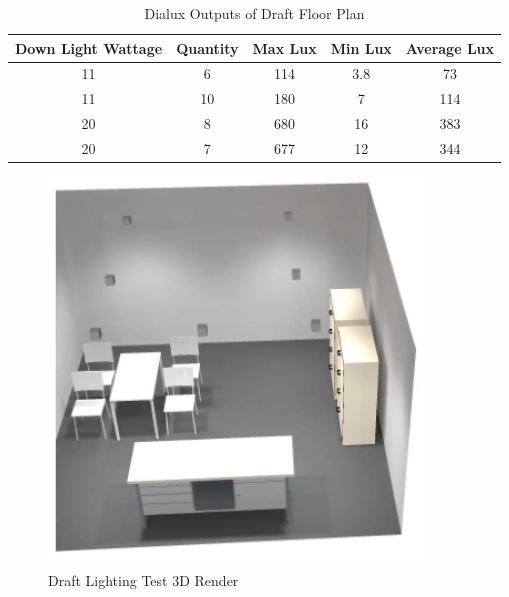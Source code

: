 \begin{table}[!ht]
\centering
\renewcommand{\arraystretch}{1}
\begin{tabular}{|c|c|c|c|c|}
\hline
\multicolumn{1}{|l|}{\textbf{Down Light Wattage}} & \multicolumn{1}{l|}{\textbf{Quantity}} & \multicolumn{1}{l|}{\textbf{Max Lux}} & \multicolumn{1}{l|}{\textbf{Min Lux}} & \multicolumn{1}{l|}{\textbf{Average Lux}} \\ \hline
11 & 6 & 114 & 3.8 & 73 \\ \hline
11 & 10 & 180 & 7 & 114 \\ \hline
20 & 8 & 680 & 16 & 383 \\ \hline
20 & 7 & 677 & 12 & 344 \\ \hline
\end{tabular}
\caption{Dialux Outputs of Draft Floor Plan}
\label{table:draftFloorPlanDialuxOutputs}
\end{table} 

\begin{figure}[H]
\hfill\includegraphics[width = 100mm]{images/lighting_draft_3D}\hspace*{\fill}
\caption{Draft Lighting Test 3D Render} 
\label{fig:DraftLighting3D}
\end{figure} 

